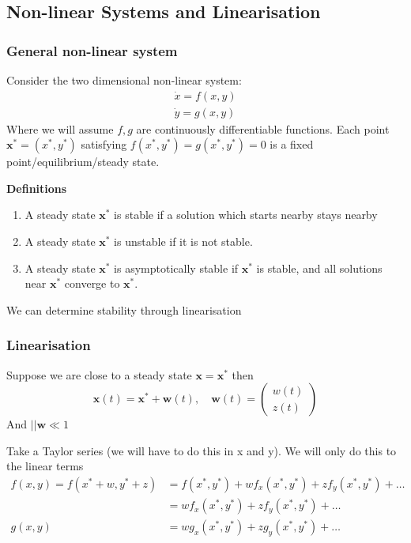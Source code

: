\documentclass{/home/janmebows/Documents/LatexTemplates/myassignment}
\begin{document}
\subsection{Non-linear Systems and Linearisation}
\subsubsection{General non-linear system}
Consider the two dimensional non-linear system:
\begin{align*}
    \dot x = f(x,y)\\
    \dot y = g(x,y)
\end{align*}
Where we will assume  $f,g$ are continuously differentiable functions.
Each point $\mathbf{x}^* = (x^*,y^*)$ satisfying $f(x^*,y^*) = g(x^*,y^*) = 0$ is a fixed point/equilibrium/steady state.

\textbf{Definitions}
\begin{enumerate}
\item A steady state $\mathbf{x}^*$ is stable if a solution which starts nearby stays nearby
\item A steady state $\mathbf{x}^*$ is unstable if it is not stable.
\item A steady state $\mathbf{x}^*$ is asymptotically stable if $\mathbf{x}^*$ is stable, and all solutions near $\mathbf{x}^*$ converge to $\mathbf{x}^*$.
\end{enumerate} 
We can determine stability through linearisation

\subsubsection{Linearisation}
Suppose we are close to a steady state $\mathbf{x} = \mathbf{x^*}$ then
\[\mathbf{x}(t) = \mathbf{x^*} + \mathbf{w}(t), \quad \mathbf{w}(t) = \begin{pmatrix}
w(t)\\z(t)
\end{pmatrix}\]
And $||\mathbf{w}\ll 1$


Take a Taylor series (we will have to do this in x and y). We will only do this to the linear terms
\begin{align*}
    f(x,y) = f(x^*+w,y^*+z) &= f(x^*,y^*) + w f_x(x^*,y^*) + zf_y(x^*,y^*) + \ldots\\
    &= w f_x(x^*,y^*) + zf_y(x^*,y^*) + \ldots\\
    g(x,y) &= wg_x(x^*,y^*) + zg_y(x^*,y^*) + \ldots
\end{align*}
\end{document}
